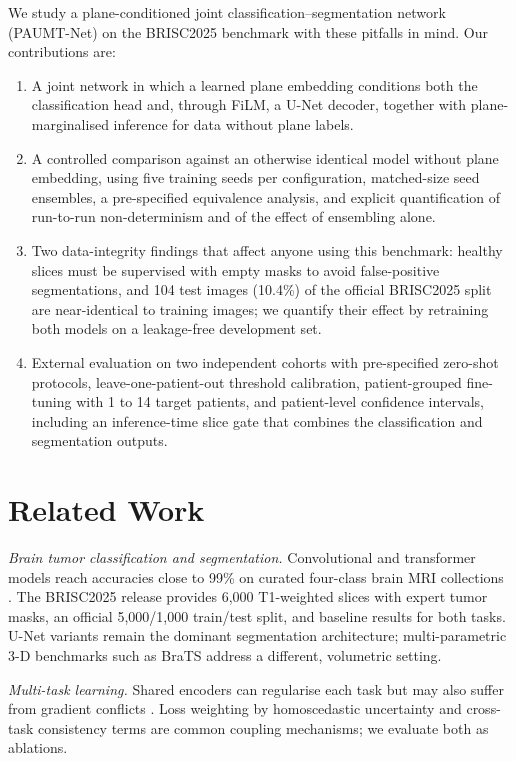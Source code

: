 \documentclass[journal]{IEEEtran}
\begin{document}
We study a plane-conditioned joint classification--segmentation network (PAUMT-Net) on the BRISC2025 benchmark \cite{fateh2026brisc} with these pitfalls in mind. Our contributions are:
\begin{enumerate}
\item A joint network in which a learned plane embedding conditions both the classification head and, through FiLM, a U-Net decoder, together with plane-marginalised inference for data without plane labels.
\item A controlled comparison against an otherwise identical model without plane embedding, using five training seeds per configuration, matched-size seed ensembles, a pre-specified equivalence analysis, and explicit quantification of run-to-run non-determinism and of the effect of ensembling alone.
\item Two data-integrity findings that affect anyone using this benchmark: healthy slices must be supervised with empty masks to avoid false-positive segmentations, and 104 test images (10.4\%) of the official BRISC2025 split are near-identical to training images; we quantify their effect by retraining both models on a leakage-free development set.
\item External evaluation on two independent cohorts with pre-specified zero-shot protocols, leave-one-patient-out threshold calibration, patient-grouped fine-tuning with 1 to 14 target patients, and patient-level confidence intervals, including an inference-time slice gate that combines the classification and segmentation outputs.
\end{enumerate}

\section{Related Work}
\textit{Brain tumor classification and segmentation.} Convolutional and transformer models reach accuracies close to 99\% on curated four-class brain MRI collections \cite{cheng2015enhanced,fateh2026brisc,ahmed2026enhancing,alkharaan2026brain}. The BRISC2025 release \cite{fateh2026brisc} provides 6{,}000 T1-weighted slices with expert tumor masks, an official 5{,}000/1{,}000 train/test split, and baseline results for both tasks. U-Net variants \cite{ronneberger2015u} remain the dominant segmentation architecture; multi-parametric 3-D benchmarks such as BraTS \cite{menze2014multimodal} address a different, volumetric setting.

\textit{Multi-task learning.} Shared encoders can regularise each task \cite{caruana1997multitask,zhang2018overview} but may also suffer from gradient conflicts \cite{sener2018multi}. Loss weighting by homoscedastic uncertainty \cite{kendall2018multi} and cross-task consistency terms \cite{luo2021semi} are common coupling mechanisms; we evaluate both as ablations.
\end{document}
